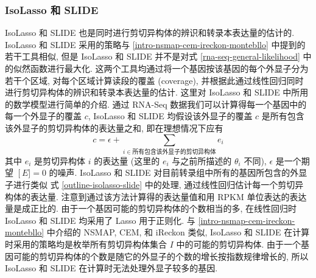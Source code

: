 \subsubsection{IsoLasso 和 SLIDE}
IsoLasso 和 SLIDE 也是同时进行剪切异构体的辨识和转录本表达量的估计的. 
IsoLasso 和 SLIDE 采用的策略与 \ref{intro-nsmap-cem-ireckon-montebllo} 
中提到的若干工具相似, 但是 IsoLasso 和 SLIDE 并不是对式 
\eqref{rna-seq-general-likelihood} 中的似然函数进行最大化. 
这两个工具均通过将一个基因按该基因的每个外显子分为若干个区域, 
对每个区域计算读段的覆盖 (coverage), 
并根据此通过线性回归同时进行剪切异构体的辨识和转录本表达量的估计. 
这里对 IsoLasso 和 SLIDE 中所用的数学模型进行简单的介绍. 
通过 RNA-Seq 数据我们可以计算得每一个基因中的每一个外显子的覆盖 $c$, 
IsoLasso 和 SLIDE 均假设该外显子的覆盖 $c$ 是所有包含该外显子的剪切异构体的表达量之和, 
即在理想情况下应有
\begin{equation}
\label{outline-isolasso-slide}
c = \epsilon + \sum_{i \in \text{所有包含该外显子的剪切异构体}} e_i
\end{equation}
其中 $e_i$ 是剪切异构体 $i$ 的表达量 (这里的 $e_i$ 与之前所描述的 $\theta_i$ 不同), 
$\epsilon$ 是一个期望 $\operatorname[E] = 0$ 的噪声. 
IsoLasso 和 SLIDE 对目前转录组中所有的基因所包含的外显子进行类似 
式 \eqref{outline-isolasso-slide} 中的处理, 通过线性回归估计每一个剪切异构体的表达量. 
注意到通过该方法计算得的表达量值和用 RPKM 单位表达的表达量是成正比的. 
由于一个基因可能的剪切异构体的个数相当的多, 
在线性回归时 IsoLasso 和 SLIDE 均采用了 Lasso 用于正则化. 
与 \ref{intro-nsmap-cem-ireckon-montebllo} 中介绍的 NSMAP, CEM, 和 iReckon 类似, 
IsoLasso 和 SLIDE 在计算时采用的策略均是枚举所有剪切异构体集合 $I$ 中的可能的剪切异构体. 
由于一个基因可能的剪切异构体的个数是随它的外显子的个数的增长按指数规律增长的, 
所以 IsoLasso 和 SLIDE 在计算时无法处理外显子较多的基因. 











